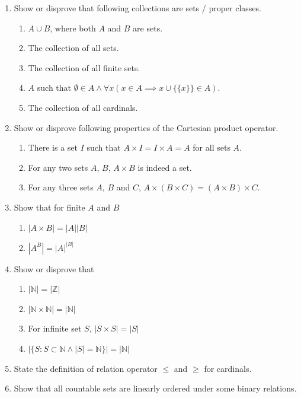 \documentclass{book}
\theoremstyle{definition}\newtheorem{mechanism}{Mechanism}
\theoremstyle{remark}\newtheorem*{remark}{Remark}
\begin{document}
\begin{enumerate}
	\item \label{exe:sets-or-pc} Show or disprove that following collections are sets / proper classes.
	\begin{enumerate}
		\item $A\cup B$, where both $A$ and $B$ are sets.
		\item The collection of all sets.
		\item The collection of all finite sets.
		\item $A$ such that $\emptyset \in A \land \forall x(x\in A\implies x\cup\{\{x\}\}\in A)$.
		\item The collection of all cardinals.
	\end{enumerate}
	\item Show or disprove following properties of the Cartesian product operator.
	\begin{enumerate}
		\item There is a set $I$ such that $A\times I = I\times A = A$ for all sets $A$.
		\item For any two sets $A$, $B$, $A\times B$ is indeed a set.
		\item For any three sets $A$, $B$ and $C$, $A\times (B\times C) = (A\times B) \times C$.
	\end{enumerate}
	\item Show that for finite $A$ and $B$
	\begin{enumerate}
		\item $|A\times B| = |A||B|$
		\item $\left|A^B\right| = |A|^{|B|}$
	\end{enumerate}
	\item Show or disprove that
	\begin{enumerate}
		\item $|\mathbb N| = |\mathbb Z|$
		\item $|\mathbb N\times \mathbb N| = |\mathbb N|$
		\item For infinite set $S$, $|S\times S| = |S|$
		\item $|\{S: S\subset \mathbb N\land |S| = \mathbb N\}| = |\mathbb N|$
	\end{enumerate}
	\item State the definition of relation operator $\le$ and $\ge$ for cardinals.
	\item Show that all countable sets are linearly ordered under some binary relations.
\end{enumerate}
\end{document}
